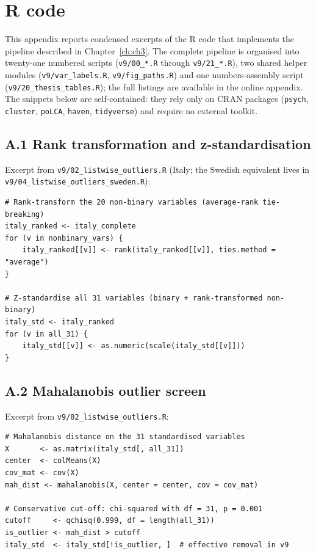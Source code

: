\chapter{R code}
\label{ch:appendix}

This appendix reports condensed excerpts of the R code that implements the pipeline described in Chapter~\ref{ch:ch3}. The complete pipeline is organised into twenty-one numbered scripts (\texttt{v9/00\_*.R} through \texttt{v9/21\_*.R}), two shared helper modules (\texttt{v9/var\_labels.R}, \texttt{v9/fig\_paths.R}) and one numbers-assembly script (\texttt{v9/20\_thesis\_tables.R}); the full listings are available in the online appendix. The snippets below are self-contained: they rely only on CRAN packages (\texttt{psych}, \texttt{cluster}, \texttt{poLCA}, \texttt{haven}, \texttt{tidyverse}) and require no external toolkit.

\section{A.1\; Rank transformation and z-standardisation}
\label{sec:appA-preprocessing}

Excerpt from \texttt{v9/02\_listwise\_outliers.R} (Italy; the Swedish equivalent lives in \texttt{v9/04\_listwise\_outliers\_sweden.R}):

\begin{lstlisting}[caption={Preprocessing: rank transformation of the 20 non-binary variables and z-standardisation of all 31.}]
# Rank-transform the 20 non-binary variables (average-rank tie-breaking)
italy_ranked <- italy_complete
for (v in nonbinary_vars) {
    italy_ranked[[v]] <- rank(italy_ranked[[v]], ties.method = "average")
}

# Z-standardise all 31 variables (binary + rank-transformed non-binary)
italy_std <- italy_ranked
for (v in all_31) {
    italy_std[[v]] <- as.numeric(scale(italy_std[[v]]))
}
\end{lstlisting}

\section{A.2\; Mahalanobis outlier screen}
\label{sec:appA-outliers}

Excerpt from \texttt{v9/02\_listwise\_outliers.R}:

\begin{lstlisting}[caption={Multivariate outlier detection on the standardised matrix.}]
# Mahalanobis distance on the 31 standardised variables
X       <- as.matrix(italy_std[, all_31])
center  <- colMeans(X)
cov_mat <- cov(X)
mah_dist <- mahalanobis(X, center = center, cov = cov_mat)

# Conservative cut-off: chi-squared with df = 31, p = 0.001
cutoff     <- qchisq(0.999, df = length(all_31))
is_outlier <- mah_dist > cutoff
italy_std  <- italy_std[!is_outlier, ]  # effective removal in v9
\end{lstlisting}

